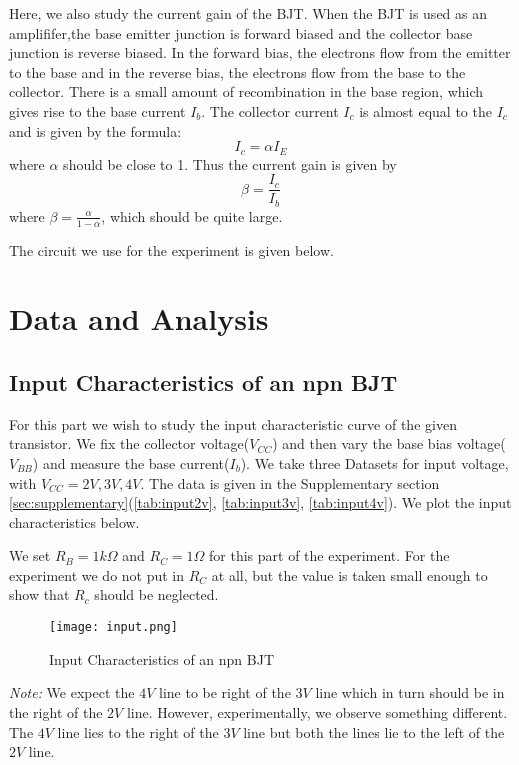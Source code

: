 \documentclass{scrartcl}
\newcommand{\1}{\mathbbm{1}}
\begin{document}
Here, we also study the current gain of the BJT. When the BJT is used as an amplififer,the base emitter junction is forward biased and the collector base junction is reverse biased. In the forward bias, the electrons flow from the 
emitter to the base and in the reverse bias, the electrons flow from the base to the collector. There is a small amount of recombination in the base region, which gives rise to the base current $I_b$. The collector current $I_c$ is
almost equal to the $I_c$ and is given by the formula:
\begin{equation}
        I_c = \alpha I_E
\end{equation}
where $\alpha$ should be close to 1. Thus the current gain is given by
\begin{equation}
        \beta = \frac{I_c}{I_b}
\end{equation}
where $\beta = \frac{\alpha}{1 - \alpha}$, which should be quite large.

The circuit we use for the experiment is given below.


\section{Data and Analysis}
\subsection{Input Characteristics of an npn BJT}
For this part we wish to study the input characteristic curve of the given transistor. We fix the collector voltage($V_{CC}$) and then vary
the base bias voltage($V_{BB}$) and measure the base current($I_b$). We take three Datasets for input voltage, with $V_{CC} = 2V, 3V, 4V$. The data is 
given in the Supplementary section \cref{sec:supplementary}(\cref{tab:input2v}, \cref{tab:input3v}, \cref{tab:input4v}). We plot the input characteristics below.

We set $R_B = 1 k \Omega$ and $R_C = 1 \Omega$ for this part of the experiment. For the experiment we do not put in $R_C$ at all, but the value is taken 
small enough to show that $R_c$ should be neglected.
\begin{figure}[H]
        \centering
        \texttt{[image: input.png]}
        \caption{Input Characteristics of an npn BJT}
\end{figure}
\emph{Note:} We expect the $4V$ line to be right of the $3V$ line which in turn should be in the right of the $2V$ line. However, experimentally, 
we observe something different. The $4V$ line lies to the right of the $3V$ line but both the lines lie to the left of the $2V$ line.
\end{document}
